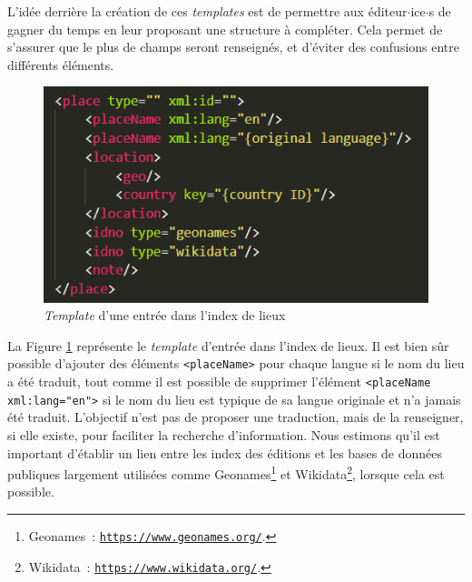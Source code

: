 L'idée derrière la création de ces \textit{templates} est de permettre aux éditeur$\cdot$ice$\cdot$s de gagner du temps en leur proposant une structure à compléter. Cela permet de s'assurer que le plus de champs seront renseignés, et d'éviter des confusions entre différents éléments.  

\begin{figure}[h]
    \centering
    \includegraphics[width=0.7\linewidth]{2-MAIN/images/index.png}
    \caption{\textit{Template} d'une entrée dans l'index de lieux}
    \label{fig:index}
\end{figure}

La Figure \ref{fig:index} représente le \textit{template} d'entrée dans l'index de lieux. Il est bien sûr possible d'ajouter des éléments \texttt{<placeName>} pour chaque langue si le nom du lieu a été traduit, tout comme il est possible de supprimer l'élément \texttt{<placeName xml:lang="en">} si le nom du lieu est typique de sa langue originale et n'a jamais été traduit. L'objectif n'est pas de proposer une traduction, mais de la renseigner, si elle existe, pour faciliter la recherche d'information. Nous estimons qu'il est important d'établir un lien entre les index des éditions et les bases de données publiques largement utilisées comme Geonames\footnote{Geonames~: \texttt{\href{https://www.geonames.org/}{https://www.geonames.org/}}.} et Wikidata\footnote{Wikidata~: \texttt{\href{https://www.wikidata.org/wiki/Wikidata:Main_Page}{https://www.wikidata.org/}}.}, lorsque cela est possible.